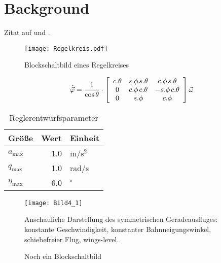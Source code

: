 \chapter{Background}

Zitat auf \cite{Johnson1994} und \cite{Bielawa1992}.

\blindtext
\begin{figure}[h]
\begin{center}
\texttt{[image: Regelkreis.pdf]}
\caption{Blockschaltbild eines Regelkreises}
\label{fig:RegelkreisBlock1}
\end{center}
\end{figure}

\blindtext

\begin{equation} \dot{\vec\varphi} = \frac{1}{\cos{\theta}} \cdot
\left[ \begin{array}{ccc} 
	   c.\theta &  s.\phi \hspace{0.5mm} s.\theta     &  c.\phi \hspace{0.5mm} s.\theta \\
	   0        &  c.\phi \hspace{0.5mm} c.\theta     & -s.\phi \hspace{0.5mm} c.\theta \\
	   0        &  s.\phi                             &  c.\phi
	   \end{array} \right] \vec \omega
\end{equation}

\blindtext

\begin{table}[h]
      \centering
      \caption{Reglerentwurfsparameter}
      \begin{tabular}{lrl}
            \toprule
            Größe & Wert & Einheit \\
            \midrule
            $a_\mathrm{max}$ & 1.0 & m/s${}^2$ \\
            $q_\mathrm{max}$ & 1.0 & rad/s \\
            $\eta_\mathrm{max}$ & 6.0 & ${}^\circ$ \\
            \bottomrule
      \end{tabular}
      \label{tbl:reglerentwurfsparameter}
\end{table}


\blindtext

\begin{figure}[tb]
\centering
\texttt{[image: Bild4\_1]}
\caption[Anschauliche Darstellung des symmetrischen Geradeausfluges]{Anschauliche Darstellung des symmetrischen Geradeausfluges: konstante Geschwindigkeit, konstanter Bahnneigungswinkel, schiebefreier Flug, \glqq wings-level\grqq. \cite{Fichter2009}}
\label{fig:LIN1}
\end{figure}

\Blindtext

\begin{figure}[h]
\centering

\caption{Noch ein Blockschaltbild}
\label{fig:RegelkreisBlock2}
\end{figure}

\blindtext

\blindtext

\blindtext